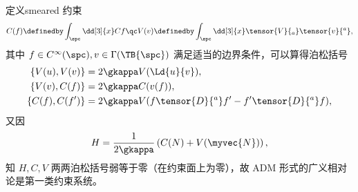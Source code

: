 
	定义smeared 约束
	\begin{equation}
		C(f) \definedby \int_{\spc} \dd[3]{x} C f  \qc V ({v}) \definedby \int_{\spc} \dd[3]{x} \tensor{V}{_a} \tensor{v}{^a},
	\end{equation}
	其中 $f\in C^\infty(\spc), v\in \Gamma(\TB{\spc})$ 满足适当的边界条件，可以算得泊松括号
	\begin{equation}
		\begin{split}
			\left\{ V({u}), V({v}) \right\} &= 2\gkappa V(\Ld{{u}} {v}),\\
			\left\{ V({v}), C(f) \right\} &= 2\gkappa C(v(f)),\\
			\left\{ C(f), C(f') \right\} &= 2\gkappa V(f\tensor{D}{^a}f'-f' \tensor{D}{^a}f),
		\end{split}
	\end{equation}
	又因
	\begin{equation}
		H = \frac{1}{2\gkappa} \left( C(N) + V(\myvec{N}) \right),
	\end{equation}
	知 $H,C,V$ 两两泊松括号弱等于零（在约束面上为零），故 ADM 形式的广义相对论是第一类约束系统。



